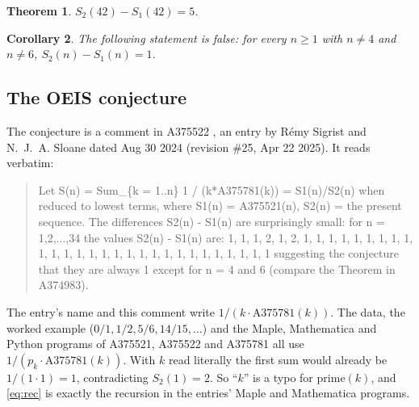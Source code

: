 \documentclass[11pt]{amsart}
\theoremstyle{plain}
\newtheorem{theorem}{Theorem}
\newtheorem{corollary}[theorem]{Corollary}
\theoremstyle{definition}
\begin{document}
\begin{theorem}\label{thm:main}
$S_2(42)-S_1(42)=5$.
\end{theorem}

\begin{corollary}\label{cor:main}
The following statement is false: for every $n\ge1$ with $n\ne4$ and $n\ne6$, $S_2(n)-S_1(n)=1$.
\end{corollary}

\subsection{The OEIS conjecture}
The conjecture is a comment in A375522 \cite{A375522}, an entry by Rémy Sigrist and N.~J.~A. Sloane dated Aug 30 2024 (revision \#25, Apr 22 2025). It reads verbatim:
\begin{quote}\small
Let S(n) = Sum\_\{k = 1..n\} 1 / (k*A375781(k)) = S1(n)/S2(n) when reduced to lowest terms, where S1(n) = A375521(n), S2(n) = the present sequence.
The differences S2(n) - S1(n) are surprisingly small: for n = 1,2,...,34 the values S2(n) - S1(n) are:
1, 1, 1, 2, 1, 2, 1, 1, 1, 1, 1, 1, 1, 1, 1, 1, 1, 1, 1, 1, 1, 1, 1, 1, 1, 1, 1, 1, 1, 1, 1, 1, 1, 1
suggesting the conjecture that they are always 1 except for n = 4 and 6 (compare the Theorem in A374983).
\end{quote}
The entry's name and this comment write $1/(k\cdot\mathrm{A375781}(k))$. The data, the worked example ($0/1, 1/2, 5/6, 14/15,\dots$) and the Maple, Mathematica and Python programs of A375521, A375522 and A375781 all use $1/(p_k\cdot\mathrm{A375781}(k))$. With $k$ read literally the first sum would already be $1/(1\cdot1)=1$, contradicting $S_2(1)=2$. So ``$k$'' is a typo for $\mathrm{prime}(k)$, and \eqref{eq:rec} is exactly the recursion in the entries' Maple and Mathematica programs.
\end{document}

